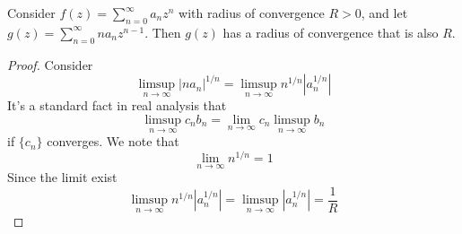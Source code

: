 \begin{corollary}\label{cor::radius_not_change}
Consider $f(z) = \sum_{n = 0}^\infty a_n z^n$ with radius of convergence $R > 0$, and let $g(z) = \sum_{n = 0}^\infty n a_n z^{n - 1}$. Then $g(z)$ has a radius of convergence that is also $R$.
\end{corollary}

\begin{proof}
Consider
\[\limsup_{n \to \infty} |n a_n|^{1/n} = \limsup_{n \to \infty} n^{1/n} |a_n^{1/n}|\]
It's a standard fact in real analysis that
\[\limsup_{n \to \infty} c_n b_n = \lim_{n \to \infty} c_n \limsup_{n \to \infty} b_n\]
if $\{c_n\}$ converges. We note that
\[\lim_{n \to \infty} n^{1/n} = 1\]
Since the limit exist
\[\limsup_{n \to \infty}  n^{1/n} |a_n^{1/n}| = \limsup_{n \to \infty} |a_n^{1/n}| = \frac{1}{R}\]
\end{proof}